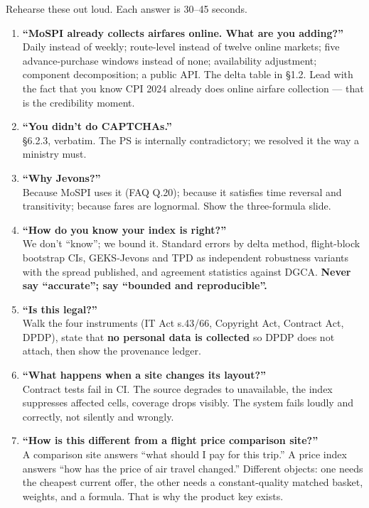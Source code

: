 Rehearse these out loud. Each answer is 30--45 seconds.

\begin{enumerate}
\item \textbf{``MoSPI already collects airfares online. What are you adding?''} \\
Daily instead of weekly; route-level instead of twelve online markets; five advance-purchase
windows instead of none; availability adjustment; component decomposition; a public API. The
delta table in \S1.2. Lead with the fact that you know CPI 2024 already does online airfare
collection --- that is the credibility moment.

\item \textbf{``You didn't do CAPTCHAs.''} \\
\S6.2.3, verbatim. The PS is internally contradictory; we resolved it the way a ministry must.

\item \textbf{``Why Jevons?''} \\
Because MoSPI uses it (FAQ Q.20); because it satisfies time reversal and transitivity;
because fares are lognormal. Show the three-formula slide.

\item \textbf{``How do you know your index is right?''} \\
We don't ``know''; we bound it. Standard errors by delta method, flight-block bootstrap CIs,
GEKS-Jevons and TPD as independent robustness variants with the spread published, and
agreement statistics against DGCA. \textbf{Never say ``accurate''; say ``bounded and
reproducible''.}

\item \textbf{``Is this legal?''} \\
Walk the four instruments (IT Act s.43/66, Copyright Act, Contract Act, DPDP), state that
\textbf{no personal data is collected} so DPDP does not attach, then show the provenance
ledger.

\item \textbf{``What happens when a site changes its layout?''} \\
Contract tests fail in CI. The source degrades to unavailable, the index suppresses affected
cells, coverage drops visibly. The system fails loudly and correctly, not silently and
wrongly.

\item \textbf{``How is this different from a flight price comparison site?''} \\
A comparison site answers ``what should I pay for this trip.'' A price index answers ``how has
the price of air travel changed.'' Different objects: one needs the cheapest current offer,
the other needs a constant-quality matched basket, weights, and a formula. That is why the
product key exists.


\end{enumerate}
